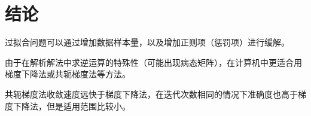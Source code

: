 \section{结论}

过拟合问题可以通过增加数据样本量，以及增加正则项（惩罚项）进行缓解。

由于在解析解法中求逆运算的特殊性（可能出现病态矩阵），在计算机中更适合用梯度下降法或共轭梯度法等方法。

共轭梯度法收敛速度远快于梯度下降法，在迭代次数相同的情况下准确度也高于梯度下降法，但是适用范围比较小。
